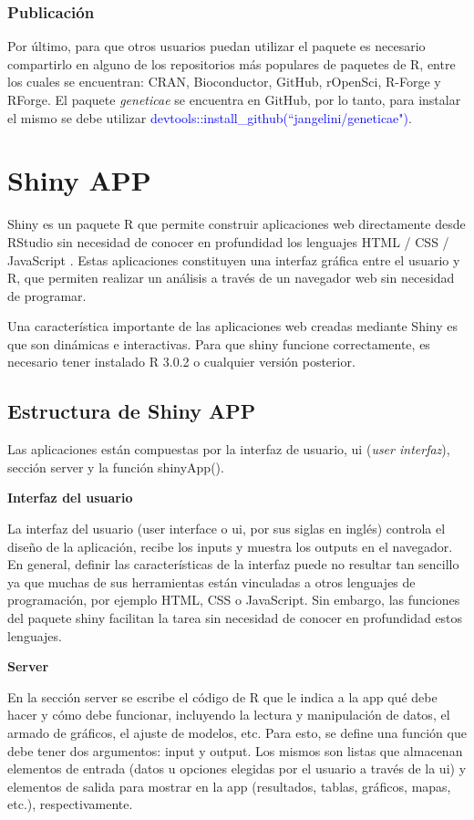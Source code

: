 \subsubsection{Publicación}


Por último, para que otros usuarios puedan utilizar el paquete es necesario compartirlo en alguno de los repositorios más populares de paquetes de R, entre los cuales se encuentran: CRAN, Bioconductor, GitHub, rOpenSci, R-Forge y RForge. El paquete \emph{geneticae} se encuentra en GitHub, por lo tanto, para instalar el mismo se debe utilizar \textcolor{blue}{devtools::install\_github(``jangelini/geneticae")}.


\section{Shiny APP}
Shiny es un paquete R que permite construir aplicaciones web directamente desde RStudio sin necesidad de conocer en profundidad los lenguajes HTML / CSS / JavaScript . Estas aplicaciones constituyen una interfaz gráfica entre el usuario y R, que permiten realizar un análisis a través de un navegador web sin necesidad de programar.

Una característica importante de las aplicaciones web creadas mediante Shiny es que son dinámicas e interactivas. Para que shiny funcione correctamente, es necesario tener instalado R 3.0.2 o cualquier versión posterior.

\subsection{Estructura de Shiny APP}

Las aplicaciones están compuestas por la interfaz de usuario, ui (\emph{user interfaz}), sección server y la función shinyApp(). 


\textbf{Interfaz del usuario}

La interfaz del usuario (user interface o ui, por sus siglas en inglés) controla el diseño de la aplicación, recibe los inputs y muestra los outputs en el navegador. En general, definir las características de la interfaz puede no resultar tan sencillo ya que muchas de sus herramientas están vinculadas a otros lenguajes de programación, por ejemplo HTML, CSS o JavaScript. Sin embargo, las funciones del paquete shiny facilitan la tarea sin necesidad de conocer en profundidad estos lenguajes.

\textbf{Server}

En la sección server se escribe el código de R que le indica a la app qué debe hacer y cómo debe funcionar, incluyendo la lectura y manipulación de datos, el armado de gráficos, el ajuste de modelos, etc. Para esto, se define una función que debe tener dos argumentos: input y output. Los mismos son listas que almacenan elementos de entrada (datos u opciones elegidas por el usuario a través de la ui) y elementos de salida para mostrar en la app (resultados, tablas, gráficos, mapas, etc.), respectivamente.


